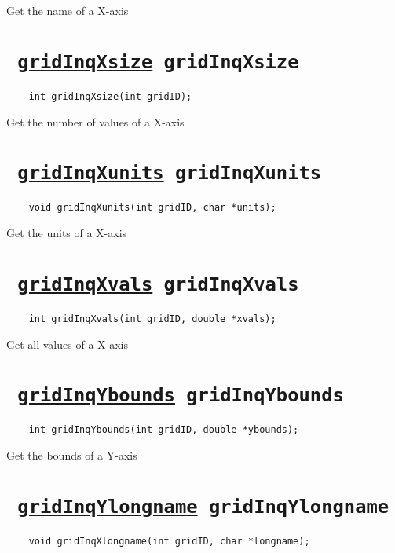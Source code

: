 Get the name of a X-axis
\ifpdfoutput{}{(\ref{gridInqXname})}


\section*{\tt 
\ifpdf
\hyperref[gridInqXsize]{gridInqXsize}
\else
gridInqXsize
\fi
}
\begin{verbatim}
    int gridInqXsize(int gridID);
\end{verbatim}

Get the number of values of a X-axis
\ifpdfoutput{}{(\ref{gridInqXsize})}


\section*{\tt 
\ifpdf
\hyperref[gridInqXunits]{gridInqXunits}
\else
gridInqXunits
\fi
}
\begin{verbatim}
    void gridInqXunits(int gridID, char *units);
\end{verbatim}

Get the units of a X-axis
\ifpdfoutput{}{(\ref{gridInqXunits})}


\section*{\tt 
\ifpdf
\hyperref[gridInqXvals]{gridInqXvals}
\else
gridInqXvals
\fi
}
\begin{verbatim}
    int gridInqXvals(int gridID, double *xvals);
\end{verbatim}

Get all values of a X-axis
\ifpdfoutput{}{(\ref{gridInqXvals})}


\section*{\tt 
\ifpdf
\hyperref[gridInqYbounds]{gridInqYbounds}
\else
gridInqYbounds
\fi
}
\begin{verbatim}
    int gridInqYbounds(int gridID, double *ybounds);
\end{verbatim}

Get the bounds of a Y-axis
\ifpdfoutput{}{(\ref{gridInqYbounds})}


\section*{\tt 
\ifpdf
\hyperref[gridInqYlongname]{gridInqYlongname}
\else
gridInqYlongname
\fi
}
\begin{verbatim}
    void gridInqXlongname(int gridID, char *longname);
\end{verbatim}

